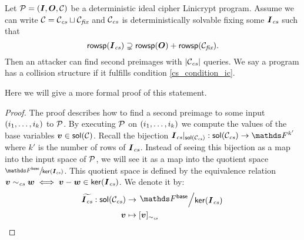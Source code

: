 \begin{prop}
\label{collision_structure_implies_attack_ic}
    Let $\P = (\I, \O, \C)$ be a deterministic ideal cipher Linicrypt program.
    Assume we can write $\C = \Ccs \sqcup \Cfix$ and
    $\Ccs$ is deterministically solvable fixing some $\Ics$ such that
    \begin{equation}
    \label{cs_condition_ic}
        \rowsp(\Ics) \supsetneq \rowsp(\O) + \rowsp(\Cfix).
    \end{equation}
    Then an attacker can find second preimages with $|\Ccs|$ queries.
    We say a program has a collision structure if it fulfills condition \eqref{cs_condition_ic}.
\end{prop}

Here we will give a more formal proof of this statement.
\begin{proof}
    The proof describes how to find a second preimage to some input $(\dts i k)$ to $\P$.
    By executing $\P$ on $(\dts i k)$ we compute the values of the base variables $\vv \in \sol(\C)$.
    Recall the bijection $\Ics|_{\sol(\Ccs)}: \sol(\Ccs) \to \F^{k'}$ where $k'$ is the number of rows of $\Ics$. 
    Instead of seeing this bijection as a map into the input space of $\P$, we will see it as a map into the quotient space
    $\sfrac{\Fsp}{\ker(\Ics)}$.
    This quotient space is defined by the equivalence relation $\vv \; \simcs \; \vw \iff \vv - \vw \in \ker(\Ics)$.
    We denote it by:
    \begin{align*}
    \widetilde\Ics: \sol(\Ccs) &\to \bigslant{\Fsp}{\ker(\Ics)} \\
    \vv &\mapsto [\vv]_\simcs
    \end{align*}
    

\end{proof}
